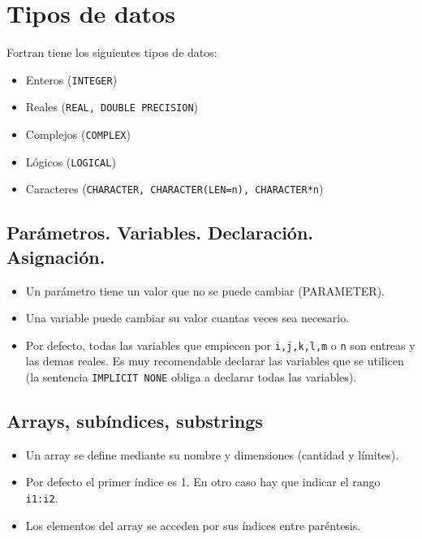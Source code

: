 \section{Tipos de datos}

Fortran tiene los siguientes tipos de datos:

\begin{itemize}
    \item Enteros ({\tt INTEGER})
    \item Reales ({\tt REAL, DOUBLE PRECISION})
    \item Complejos ({\tt COMPLEX})
    \item Lógicos ({\tt LOGICAL})
    \item Caracteres ({\tt CHARACTER, CHARACTER(LEN=n), CHARACTER*n})
\end{itemize}

\subsection{Parámetros. Variables. Declaración. Asignación.}

\begin{itemize}
    \item Un parámetro tiene un valor que no se puede cambiar (PARAMETER).
    \item Una variable puede cambiar su valor cuantas veces sea necesario. 
    \item Por defecto, todas las variables que empiecen por \texttt{i,j,k,l,m} o \texttt{n} son entreas y las demas reales. Es muy recomendable declarar las variables que se utilicen (la sentencia {\tt IMPLICIT NONE} obliga a declarar todas las variables).
\end{itemize}

\subsection{Arrays, subíndices, substrings}

\begin{itemize}
    \item Un array se define mediante su nombre y dimensiones (cantidad y límites).
    \item Por defecto el primer índice es 1. En otro caso hay que indicar el rango {\tt i1:i2}.
    \item Los elementos del array se acceden por sus índices entre paréntesis.
\end{itemize}

